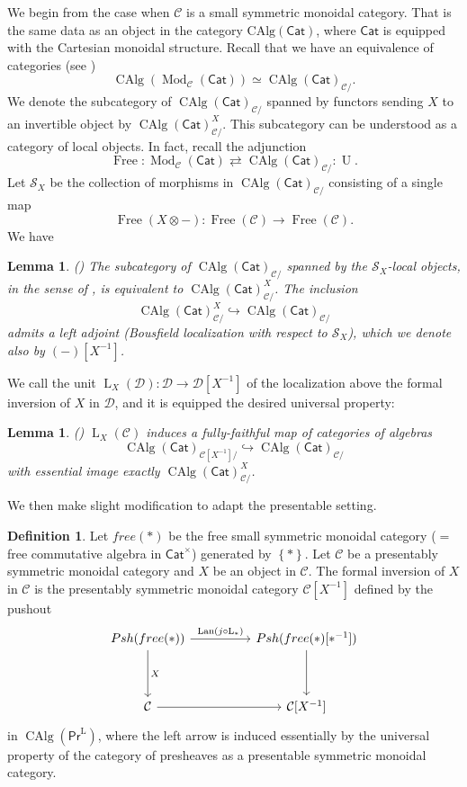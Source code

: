 \documentclass{article}
\newtheorem{lm}[thm]{Lemma}
\theoremstyle{definition}
\newtheorem{defn}[thm]{Definition}
\newcommand{\on}{\operatorname}
\newcommand{\PrL}{\mathsf{Pr}^\mathrm{L} }
\begin{document}
We begin from the case when $\mathcal{C}$ is a small symmetric monoidal category. That is the same data as an object in the category $\on{CAlg(\mathsf{Cat})}$, where $\mathsf{Cat}$ is equipped with the Cartesian monoidal structure. Recall that we have an equivalence of categories (see \cite[Proposition 3.16]{Rob})\[
\on{CAlg}(\on{Mod}_\mathcal{C}(\mathsf{Cat}))\simeq \on{CAlg}(\mathsf{Cat})_{\mathcal{C}/}.\]
We denote the subcategory of $\on{CAlg}(\mathsf{Cat})_{\mathcal{C}/}$ spanned by functors sending $X$ to an invertible object by $\on{CAlg}(\mathsf{Cat})_{\mathcal{C}/}^X$. This subcategory can be understood as a category of local objects. In fact, recall the adjunction\[
\on{Free}:\on{Mod}_\mathcal{C}(\mathsf{Cat})\rightleftarrows \on{CAlg}(\mathsf{Cat})_{\mathcal{C}/}:\on{U}.
\]
Let $\mathcal{S}_X$ be the collection of morphisms in $\on{CAlg}(\mathsf{Cat})_{\mathcal{C}/}$ consisting of a single map \[\on{Free}(X\otimes -):\on{Free}(\mathcal{C})\rightarrow\on{Free}(\mathcal{C}).\] We have
\begin{lm}(\cite[Proposition 4.1]{Rob})
The subcategory of $\on{CAlg}(\mathsf{Cat})_{\mathcal{C}/}$ spanned by the $\mathcal{S}_X$-local objects, in the sense of \cite[Definition 5.5.4.1]{HTT}, is equivalent to $\on{CAlg}(\mathsf{Cat})_{\mathcal{C}/}^X$. The inclusion\[
\on{CAlg}(\mathsf{Cat})_{\mathcal{C}/}^X\hookrightarrow \on{CAlg}(\mathsf{Cat})_{\mathcal{C}/}\]
admits a left adjoint (Bousfield localization with respect to $\mathcal{S}_X$), which we denote also by $(-)[X^{-1}]$.
\end{lm}
We call the unit $\on{L}_X(\mathcal{D}): \mathcal{D}\rightarrow \mathcal{D}[X^{-1}]$ of the localization above the formal inversion of $X$ in $\mathcal{D}$, and it is equipped the desired universal property:
\begin{lm}(\cite[Proposition 4.2]{Rob})
$\on{L}_X(\mathcal{C})$ induces a fully-faithful map of categories of algebras\[
\on{CAlg}(\mathsf{Cat})_{\mathcal{C}[X^{-1}]/}\hookrightarrow\on{CAlg}(\mathsf{Cat})_{\mathcal{C}/}\]
with essential image exactly $\on{CAlg}(\mathsf{Cat})^X_{\mathcal{C}/}$.
\end{lm}
We then make slight modification to adapt the presentable setting.
\begin{defn}\label{def.formal.inversion}
Let $free(\ast)$ be the free small symmetric monoidal category ($=$free commutative algebra in $\mathsf{Cat}^\times$) generated by $\left\{\ast\right\}$. Let $\mathcal{C}$ be a presentably symmetric monoidal category and $X$ be an object in $\mathcal{C}$. The formal inversion of $X$ in $\mathcal{C}$ is the presentably symmetric monoidal category $\mathcal{C}[X^{-1}]$ defined by the pushout
\[\begin{tikzcd}
	{Psh(free(\ast))} && {Psh(free(\ast)[\ast^{-1}])} \\
	\\
	{\mathcal{C}} && {\mathcal{C}[X^{-1}]}
	\arrow["\on{Lan}(j\circ\on{L}_\ast)", from=1-1, to=1-3]
	\arrow["X", from=1-1, to=3-1]
	\arrow[from=1-3, to=3-3]
	\arrow[from=3-1, to=3-3]
\end{tikzcd}\]
in $\on{CAlg}(\PrL)$, where the left arrow is induced essentially by the universal property of the category of presheaves as a presentable symmetric monoidal category.
\end{defn}
\end{document}
